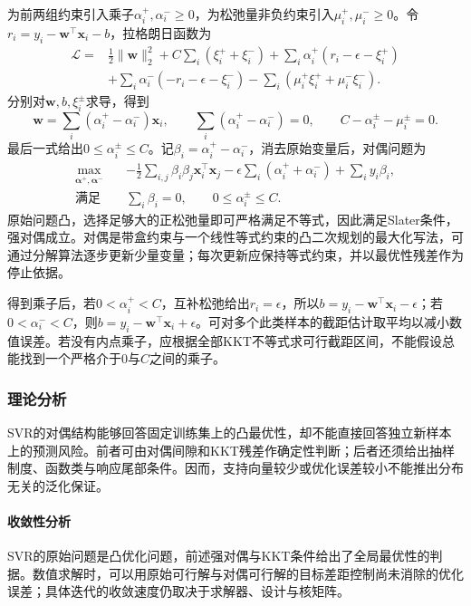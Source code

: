 为前两组约束引入乘子$\alpha_i^+,\alpha_i^-\geq0$，为松弛量非负约束引入$\mu_i^+,\mu_i^-\geq0$。令$r_i=y_i-\bm{w}^{\top}\bm{x}_i-b$，拉格朗日函数为
\[
  \begin{aligned}
    \mathcal{L}={}&\tfrac12\lVert\bm{w}\rVert_2^2
       +C\sum_i(\xi_i^++\xi_i^-)
       +\sum_i\alpha_i^+(r_i-\epsilon-\xi_i^+)\\
       &+\sum_i\alpha_i^-(-r_i-\epsilon-\xi_i^-)
       -\sum_i(\mu_i^+\xi_i^++\mu_i^-\xi_i^-).
  \end{aligned}
\]
分别对$\bm{w},b,\xi_i^\pm$求导，得到
\[
  \bm{w}=\sum_i(\alpha_i^+-\alpha_i^-)\bm{x}_i,\qquad
  \sum_i(\alpha_i^+-\alpha_i^-)=0,\qquad
  C-\alpha_i^\pm-\mu_i^\pm=0.
\]
最后一式给出$0\leq\alpha_i^\pm\leq C$。记$\beta_i=\alpha_i^+-\alpha_i^-$，消去原始变量后，对偶问题为
\begin{equation}
  \begin{aligned}
    \max_{\bm{\alpha}^+,\bm{\alpha}^-}\quad&
       -\tfrac12\sum_{i,j}\beta_i\beta_j\bm{x}_i^{\top}\bm{x}_j
       -\epsilon\sum_i(\alpha_i^++\alpha_i^-)
       +\sum_i y_i\beta_i,\\
    \text{满足}\quad&
       \sum_i\beta_i=0,\qquad 0\leq\alpha_i^\pm\leq C.
  \end{aligned}
  \label{eq:regression-svr-dual}
\end{equation}
原始问题凸，选择足够大的正松弛量即可严格满足不等式，因此满足Slater条件，强对偶成立。对偶是带盒约束与一个线性等式约束的凸二次规划的最大化写法，可通过分解算法逐步更新少量变量；每次更新应保持等式约束，并以最优性残差作为停止依据。

得到乘子后，若$0<\alpha_i^+<C$，互补松弛给出$r_i=\epsilon$，所以$b=y_i-\bm{w}^{\top}\bm{x}_i-\epsilon$；若$0<\alpha_i^-<C$，则$b=y_i-\bm{w}^{\top}\bm{x}_i+\epsilon$。可对多个此类样本的截距估计取平均以减小数值误差。若没有内点乘子，应根据全部KKT不等式求可行截距区间，不能假设总能找到一个严格介于$0$与$C$之间的乘子。

\subsubsection{理论分析}

SVR的对偶结构能够回答固定训练集上的凸最优性，却不能直接回答独立新样本上的预测风险。前者可由对偶间隙和KKT残差作确定性判断；后者还须给出抽样制度、函数类与响应尾部条件。因而，支持向量较少或优化误差较小不能推出分布无关的泛化保证。

\paragraph{收敛性分析}
SVR的原始问题是凸优化问题，前述强对偶与KKT条件给出了全局最优性的判据。数值求解时，可以用原始可行解与对偶可行解的目标差距控制尚未消除的优化误差；具体迭代的收敛速度仍取决于求解器、设计与核矩阵。

